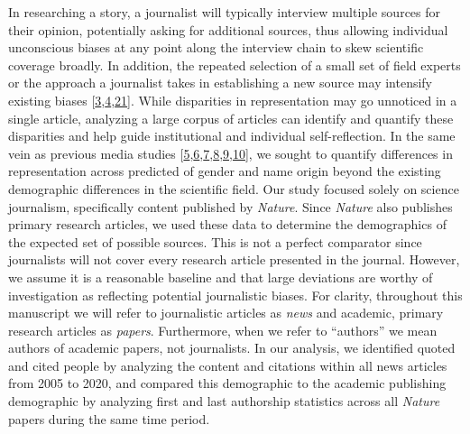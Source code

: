 In researching a story, a journalist will typically interview multiple sources for their opinion, potentially asking for additional sources, thus allowing individual unconscious biases at any point along the interview chain to skew scientific coverage broadly.
In addition, the repeated selection of a small set of field experts or the approach a journalist takes in establishing a new source may intensify existing biases {[}\protect\hyperlink{ref-gud4dlat}{3},\protect\hyperlink{ref-soMuDIhH}{4},\protect\hyperlink{ref-11fb3ccQ4}{21}{]}.
While disparities in representation may go unnoticed in a single article, analyzing a large corpus of articles can identify and quantify these disparities and help guide institutional and individual self-reflection.
In the same vein as previous media studies {[}\protect\hyperlink{ref-zAQZlRnL}{5},\protect\hyperlink{ref-2svoFkJj}{6},\protect\hyperlink{ref-1onBkffH}{7},\protect\hyperlink{ref-WRatNaGC}{8},\protect\hyperlink{ref-DvlDdQFN}{9},\protect\hyperlink{ref-1718NkivT}{10}{]}, we sought to quantify differences in representation across predicted of gender and name origin beyond the existing demographic differences in the scientific field.
Our study focused solely on science journalism, specifically content published by \emph{Nature}.
Since \emph{Nature} also publishes primary research articles, we used these data to determine the demographics of the expected set of possible sources.
This is not a perfect comparator since journalists will not cover every research article presented in the journal.
However, we assume it is a reasonable baseline and that large deviations are worthy of investigation as reflecting potential journalistic biases.
For clarity, throughout this manuscript we will refer to journalistic articles as \emph{news} and academic, primary research articles as \emph{papers}.
Furthermore, when we refer to ``authors'' we mean authors of academic papers, not journalists.
In our analysis, we identified quoted and cited people by analyzing the content and citations within all news articles from 2005 to 2020, and compared this demographic to the academic publishing demographic by analyzing first and last authorship statistics across all \emph{Nature} papers during the same time period.

